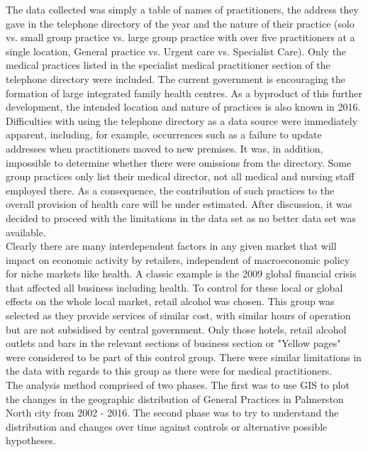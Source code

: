 \documentclass[11pt,a4paper]{article}
\begin{document}
The data collected was simply a table of names of practitioners, the address they gave in the telephone directory of the year and the nature of their practice (solo vs. small group practice vs. large group practice with over five practitioners at a single location,  General practice vs. Urgent care vs. Specialist Care). Only the  medical practices listed in the specialist medical practitioner section of the telephone directory were included. The current government is encouraging the formation of large integrated family health centres. As a byproduct of this further development, the intended location and nature of practices is also known in 2016.\\

Difficulties with using the telephone directory as a data source were immediately apparent, including, for example, occurrences such as a failure to update addresses when practitioners moved to new premises. It was, in addition,  impossible to determine whether there were omissions from the directory. Some group practices only list their medical director, not all medical and nursing staff employed there. As a consequence, the contribution of such practices to the overall provision of health care will be under estimated.  After discussion, it was decided to proceed with the limitations in the data set as no better data set was available.  \\

Clearly there are many interdependent factors in any given market that will impact on economic activity by retailers, independent of macroeconomic policy for niche markets like health. A classic example is the 2009 global financial crisis that affected all business including health. To control for these local or global effects on the whole local market, retail alcohol was chosen.  This group was selected as they provide services of similar cost, with similar hours of operation but are not subsidised by central government. Only those hotels, retail alcohol outlets and bars in the relevant sections of business section or "Yellow pages" were considered to be part of this control group. There were similar limitations in the data with regards to this group as there were for medical practitioners.\\

The analysis method comprised of two phases. The first was to use GIS to plot the changes in the geographic distribution of General Practices in Palmerston North city from 2002 - 2016. The second phase was to try to understand the distribution and changes over time against controls or alternative possible hypotheses. \\
\end{document}
